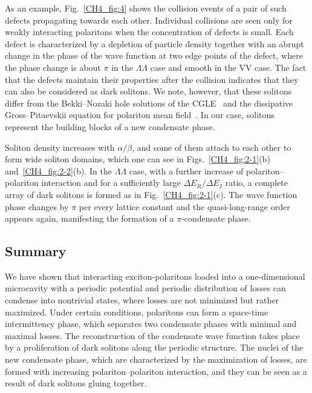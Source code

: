 As an example, Fig.~\ref{CH4_fig:4} shows the collision events of a pair of such defects propagating towards each other.
Individual collisions are seen only for weakly interacting polaritons when the concentration of defects is small.
Each defect is characterized by a depletion of particle density together with an abrupt change in the phase of the wave function at two edge points of the defect, where the phase change is about $\pi$ in the $\Lambda\Lambda$ case and smooth in the VV case.
The fact that the defects maintain their properties after the collision indicates that they can also be considered as dark solitons.
We note, however, that these solitons differ from the Bekki--Nozaki hole solutions of the CGLE~\cite{Bekki:1985aa} and the dissipative Gross--Pitaevskii equation for polariton mean field~\cite{Xue:2014aa}.
In our case, solitons represent the building blocks of a new condensate phase.

Soliton density increases with $\alpha/\beta$, and some of them attach to each other to form wide soliton domains, which one can see in Figs.~\ref{CH4_fig:2-1}(b) and~\ref{CH4_fig:2-2}(b).
In the $\Lambda\Lambda$ case, with a further increase of polariton--polariton interaction and for a sufficiently large ${\Delta}E_R/{\Delta}E_I$ ratio, a complete array of dark solitons is formed as in Fig.~\ref{CH4_fig:2-1}(c).
The wave function phase changes by $\pi$ per every lattice constant and the quasi-long-range order appears again, manifesting the formation of a $\pi$-condensate phase.

%
%
\subsection{Summary}
We have shown that interacting exciton-polaritons loaded into a one-dimensional microcavity with a periodic potential and periodic distribution of losses can condense into nontrivial states, where losses are not minimized but rather maximized.
Under certain conditions, polaritons can form a space-time intermittency phase, which separates two condensate phases with minimal and maximal losses.
The reconstruction of the condensate wave function takes place by a proliferation of dark solitons along the periodic structure.
The nuclei of the new condensate phase, which are characterized by the maximization of losses, are formed with increasing polariton--polariton interaction, and they can be seen as a result of dark solitons gluing  together.
